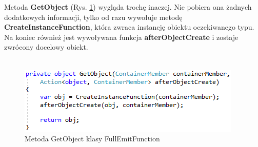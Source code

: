 \documentclass[12pt]{article}
\begin{document}
Metoda \textbf{GetObject} (Rys. \ref{fig:FullEmitFunction_GetObject}) wygląda trochę inaczej. Nie pobiera ona żadnych dodatkowych informacji, tylko od razu wywołuje metodę \textbf{CreateInstanceFunction}, która zwraca instancję obiektu oczekiwanego typu. Na koniec również jest wywoływana funkcja \textbf{afterObjectCreate} i zostaje zwrócony docelowy obiekt.\\ \\
\begin{figure}[H]
	\begin{center}
  		\includegraphics{FullEmitFunction_GetObject.png}
  		\caption{Metoda GetObject klasy FullEmitFunction}
  		\label{fig:FullEmitFunction_GetObject}
	\end{center}
\end{figure}
\end{document}
